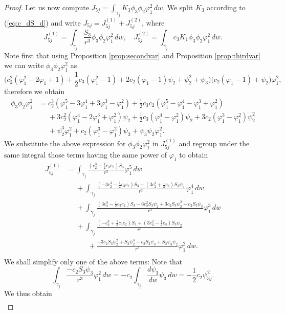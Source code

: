 \begin{proof}
Let us now compute $J_{5j}=\int_{\gamma_j}K_3\phi_3\phi_2\varphi_1^2\,dw$. We split $K_3$ according to (\ref{eq:c_dS_d}) and write $J_{5j}=J_{5j}^{(1)}+J_{5j}^{(2)}$, where
\[ J_{5j}^{(1)}=\int_{\gamma_j}\frac{S_3}{r^3}\phi_3\phi_2\varphi_1^2\,dw, \quad J_{5j}^{(2)}=\int_{\gamma_j}c_3K_1\phi_3\phi_2\varphi_1^2\,dw. \]
Note first that using Proposition \ref{prop:secondvar} and Proposition \ref{prop:thirdvar} we can write $\phi_3\phi_2\varphi_1^2$ as
\[ \big( c_2^2(\varphi_1^2-2\varphi_1+1)+\frac{1}{2}c_3(\varphi_1^2-1)+2c_2(\varphi_1-1)\psi_2+ \psi_2^2+\psi_3\big)\big( c_2(\varphi_1-1)+\psi_2\big)\varphi_1^2, \]
therefore we obtain
\begin{align}
\phi_3\phi_2\varphi_1^2 &= c_2^3(\varphi_1^5-3\varphi_1^4+3\varphi_1^3-\varphi_1^2)+\frac{1}{2}c_3c_2(\varphi_1^5-\varphi_1^4-\varphi_1^3+\varphi_1^2) \nonumber \\
&\phantom{=} +3c_2^2(\varphi_1^4-2\varphi_1^3+\varphi_1^2)\psi_2+\frac{1}{2}c_3(\varphi_1^4-\varphi_1^2)\psi_2 +3c_2(\varphi_1^3-\varphi_1^2)\psi_2^2 \label{eq:J5v0} \\
&\phantom{=} +\psi_2^3\varphi_1^2 +c_2(\varphi_1^3-\varphi_1^2)\psi_3 +\psi_3\psi_2\varphi_1^2. \nonumber 
\end{align}
We substitute the above expression for $\phi_3\phi_2\varphi_1^2$ in $J_{5j}^{(1)}$ and regroup under the same integral those terms having the same power of $\varphi_1$ to obtain
\begin{align}
J_{5j}^{(1)} &= \int_{\gamma_j}\frac{(c_2^3+\frac{1}{2}c_3c_2)S_3}{r^3}\varphi_1^5\,dw\nonumber \\
&\phantom{=} + \int_{\gamma_j}\frac{(-3c_2^3-\frac{1}{2}c_3c_2)S_3+(3c_2^2+\frac{1}{2}c_3)S_3\psi_2}{r^3}\,\varphi_1^4\,dw \nonumber \\
&\phantom{=} +\int_{\gamma_j}\frac{(3c_2^3-\frac{1}{2}c_3c_2)S_3-6c_2^2S_3\psi_2+3c_2S_3\psi_2^2+c_2S_3\psi_3}{r^3}\varphi_1^3\,dw \label{eq:J5(1)v0} \\
&\phantom{=} +\int_{\gamma_j}\frac{(-c_2^3+\frac{1}{2}c_3c_2)S_3+(3c_2^2-\frac{1}{2}c_3)S_3\psi_2}{r^3}\nonumber \\
&\phantom{=\int_{\gamma_j}} + \frac{-3c_2S_3\psi_2^2+S_3\psi_2^3-c_2S_3\psi_3+S_3\psi_3\psi_2}{r^3}\varphi_1^2\,dw. \nonumber
\end{align}
We shall simplify only one of the above terms: Note that 
\[ \int_{\gamma_j}\frac{-c_2S_3\psi_3}{r^3}\varphi_1^2\,dw =-c_2\int_{\gamma_j}\frac{d\psi_3}{dw}\psi_3\,dw=-\frac{1}{2}c_2\psi_{3j}^2.\]
We thus obtain
\begin{align}

\end{align}
\end{proof}
